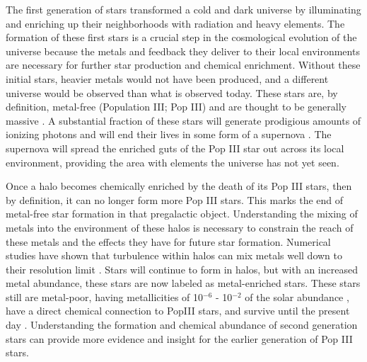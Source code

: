 \documentclass[a4paper,fleqn,usenatbib]{mnras}
\begin{document}
The first generation of stars transformed a cold and dark universe
by illuminating and enriching up their neighborhoods with radiation
and heavy elements. The formation of these first stars is a crucial step in the cosmological evolution of the universe because the metals and feedback they deliver to their local environments are necessary for further star production and chemical enrichment. Without these initial stars, heavier metals would not have been produced, and a different universe would be observed than what is observed today. These stars are, by definition, metal-free (Population III; Pop III) and are thought to be generally massive \citep{ABN02, Bromm02_P3, Turk09, Hosokawa11, Hosokawa16, Hirano15}. A substantial fraction of these stars will generate prodigious amounts of ionizing photons and will end their lives in some form of a supernova \citep[e.g.][]{Schaerer02, Heger02}. The supernova will spread the enriched guts of the Pop III star out across its local environment, providing the area with elements the universe has not yet seen. 

Once a halo becomes chemically enriched by the death of its Pop III stars, then by definition, it can no longer form more Pop III stars. This marks the end of metal-free star formation in that pregalactic object. Understanding the mixing of metals into the environment of these halos is necessary to constrain the reach of these metals and the effects they have for future star formation. Numerical studies have shown that turbulence within halos can mix metals well down to their resolution limit \citep[][and more]{Wise08_Gal, Greif10, Smith15}. Stars will continue to form in halos, but with an increased metal abundance, these stars are now labeled as metal-enriched stars. These stars still are metal-poor, having metallicities of 10$^{-6}$ - 10$^{-2}$ of the solar abundance \citep{Chiaki16, Chiaki18, Ritter16}, have a direct chemical connection to PopIII stars, and survive until the present day \citep{Gnedin06, Tumlinson10, Griffen18, Magg18}. Understanding the formation and chemical abundance of second generation stars can provide more evidence and insight for the earlier generation of Pop III stars.
\end{document}
